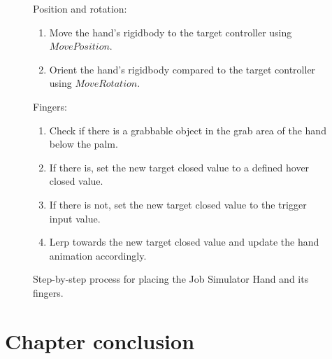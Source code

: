 \begin{figure}[H]
\centering
\small
Position and rotation:
\begin{enumerate}[noitemsep]
\item Move the hand's rigidbody to the target controller using $MovePosition$.
\item Orient the hand's rigidbody compared to the target controller using $MoveRotation$.
\end{enumerate}
Fingers:
\begin{enumerate}[noitemsep]
\item Check if there is a grabbable object in the grab area of the hand below the palm.
\item If there is, set the new target closed value to a defined hover closed value.
\item If there is not, set the new target closed value to the trigger input value.
\item Lerp towards the new target closed value and update the hand animation accordingly.
\end{enumerate}
\caption{Step-by-step process for placing the Job Simulator Hand and its fingers.}
\label{fig:stepByStepJobSimHand}
\end{figure}

\section{Chapter conclusion}
\label{sec:CHAPTERCONCLUSION}


